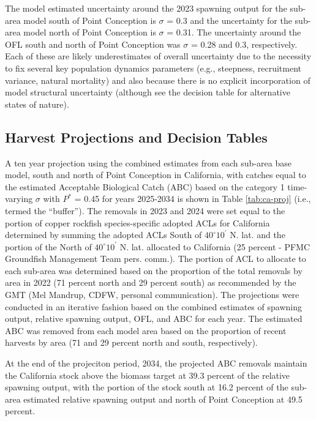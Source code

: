 \documentclass[11pt,
  english,
  letterpaper,
]{article}
\begin{document}
The model estimated uncertainty around the 2023 spawning output for the sub-area model south of Point Conception is \(\sigma\) = 0.3 and the uncertainty for the sub-area model north of Point Conception is \(\sigma\) = 0.31. The uncertainty around the OFL south and north of Point Conception was \(\sigma\) = 0.28 and 0.3, respectively. Each of these are likely underestimates of overall uncertainty due to the necessity to fix several key population dynamics parameters (e.g., steepness, recruitment variance, natural mortality) and also because there is no explicit incorporation of model structural uncertainty (although see the decision table for alternative states of nature).

\hypertarget{harvest-projections-and-decision-tables}{%
\subsection{Harvest Projections and Decision Tables}\label{harvest-projections-and-decision-tables}}

A ten year projection using the combined estimates from each sub-area base model, south and north of Point Conception in California, with catches equal to the estimated Acceptable Biological Catch (ABC) based on the category 1 time-varying \(\sigma\) with \(P^*\) = 0.45 for years 2025-2034 is shown in Table \ref{tab:ca-proj} (i.e., termed the ``buffer''). The removals in 2023 and 2024 were set equal to the portion of copper rockfish species-specific adopted ACLs for California determined by summing the adopted ACLs South of $40^\circ 10^\prime$ N. lat. and the portion of the North of $40^\circ 10^\prime$ N. lat. allocated to California (25 percent - PFMC Groundfish Management Team pers. comm.). The portion of ACL to allocate to each sub-area was determined based on the proportion of the total removals by area in 2022 (71 percent north and 29 percent south) as recommended by the GMT (Mel Mandrup, CDFW, personal communication). The projections were conducted in an iterative fashion based on the combined estimates of spawning output, relative spawning output, OFL, and ABC for each year. The estimated ABC was removed from each model area based on the proportion of recent harvests by area (71 and 29 percent north and south, respectively).

At the end of the projeciton period, 2034, the projected ABC removals maintain the California stock above the biomass target at 39.3 percent of the relative spawning output, with the portion of the stock south at 16.2 percent of the sub-area estimated relative spawning output and north of Point Conception at 49.5 percent.
\end{document}
